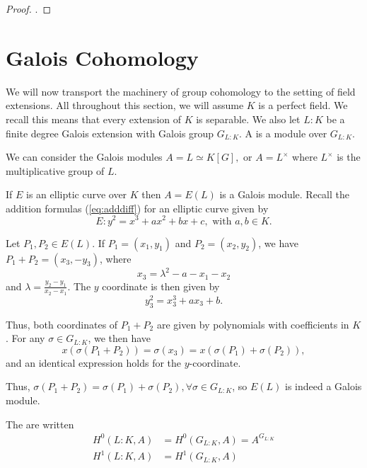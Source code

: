 \documentclass[12pt, a4paper]{report}
\begin{document}
\begin{proof}
  \cite[See][Appendix B, Pages 416-417]{arithmetic}.
\end{proof}

\section{Galois Cohomology}

We will now transport the machinery of group cohomology to the setting of
field extensions.
All throughout this section, we will assume $K$ is a perfect field. We recall
this means that every extension of $K$ is separable. 
We also let $L : K$ be a finite degree Galois
extension with Galois group $G_{L:K}$.
A  is a module over $G_{L:K}$.

\begin{example}
  We can consider the Galois modules $A = L \simeq K[G], $ or $A =
  L^{\times}$ where $L^{\times}$ is the multiplicative group of $L$.
\end{example}

\begin{example}
  If $E$ is an elliptic curve over $K$ then $A = E(L)$ is a Galois module.
  Recall the addition formulas (\autoref{eq:adddiff}) for an elliptic curve given by 
  \[E: y^2 = x^3 + ax^2 + bx + c, \text{ with } a, b \in K.\]
  
  Let $P_1, P_2 \in E(L)$. 
  If $P_1 = (x_1, y_1)$ and $P_2 = (x_2,y_2)$, we have $P_1+P_2 = (x_3,-y_3)$,
  where
  \[x_3 = \lambda^2 - a - x_1 - x_2\]
  and $\lambda = \frac{y_2-y_1}{x_2-x_1}.$ The $y$ coordinate is then given by
  \[y_3^2 = x_3^3 + ax_3 + b.\]
  
  Thus, both coordinates of $P_1+P_2$ are given by polynomials with coefficients
  in $K$. 
  For any $\sigma \in G_{L:K}$, we then have
  \[x(\sigma(P_1+P_2)) = \sigma(x_3) = x(\sigma(P_1) + \sigma(P_2)),\]
  and an identical expression holds for the $y$-coordinate.
  
  Thus, $\sigma(P_1+P_2) = \sigma(P_1) + \sigma(P_2), \forall \sigma \in
  G_{L:K}$, so $E(L)$ is indeed a Galois module. 

\end{example}

\begin{defn}
  The  are written
  \begin{equation*}
    \begin{split}
      H^0(L:K, A) &= H^0(G_{L:K}, A) = A^{G_{L:K}} \\
      H^1(L:K, A) &= H^1(G_{L:K}, A)
     \end{split}
   \end{equation*}
\end{defn}
\end{document}
